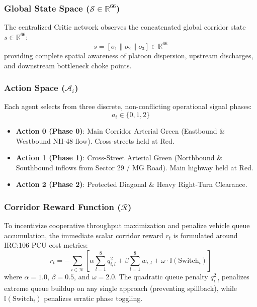 \documentclass[12pt,a4paper,oneside]{report}
\begin{document}
\subsubsection{Global State Space ($\mathcal{S} \in \mathbb{R}^{66}$)}
The centralized Critic network observes the concatenated global corridor state $s \in \mathbb{R}^{66}$:
\begin{equation}
s = [o_1 \parallel o_2 \parallel o_3] \in \mathbb{R}^{66}
\end{equation}
providing complete spatial awareness of platoon dispersion, upstream discharges, and downstream bottleneck choke points.

\subsubsection{Action Space ($\mathcal{A}_i$)}
Each agent selects from three discrete, non-conflicting operational signal phases:
\begin{equation}
a_i \in \{0, 1, 2\}
\end{equation}
\begin{itemize}
    \item \textbf{Action 0 (Phase 0)}: Main Corridor Arterial Green (Eastbound \& Westbound NH-48 flow). Cross-streets held at Red.
    \item \textbf{Action 1 (Phase 1)}: Cross-Street Arterial Green (Northbound \& Southbound inflows from Sector 29 / MG Road). Main highway held at Red.
    \item \textbf{Action 2 (Phase 2)}: Protected Diagonal \& Heavy Right-Turn Clearance.
\end{itemize}

\subsubsection{Corridor Reward Function ($\mathcal{R}$)}
To incentivize cooperative throughput maximization and penalize vehicle queue accumulation, the immediate scalar corridor reward $r_t$ is formulated around IRC:106 PCU cost metrics:
\begin{equation}
r_t = - \sum_{i \in \mathcal{N}} \left[ \alpha \sum_{l=1}^8 q_{i,l}^2 + \beta \sum_{l=1}^8 w_{i,l} + \omega \cdot \mathbb{I}(\text{Switch}_i) \right]
\end{equation}
where $\alpha = 1.0$, $\beta = 0.5$, and $\omega = 2.0$. The quadratic queue penalty $q_{i,l}^2$ penalizes extreme queue buildup on any single approach (preventing spillback), while $\mathbb{I}(\text{Switch}_i)$ penalizes erratic phase toggling.
\end{document}

